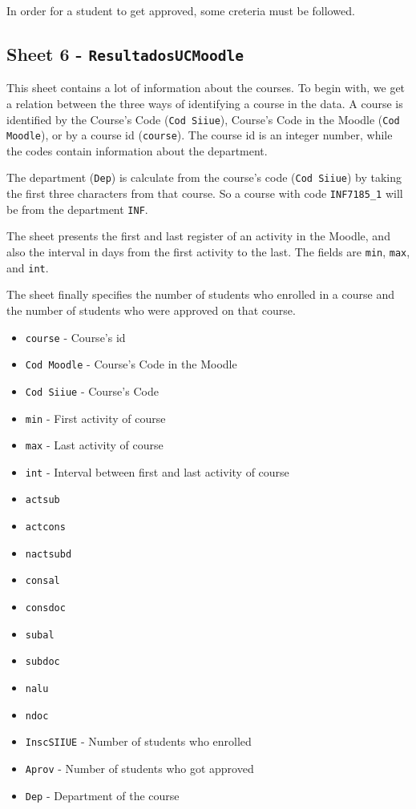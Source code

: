 In order for a student to get approved, some creteria must be followed.

\subsection{Sheet 6 - \texttt{ResultadosUCMoodle}}

This sheet contains a lot of information about the courses. To begin with, we
get a relation between the three ways of identifying a course in the data. A
course is identified by the Course's Code (\texttt{Cod Siiue}), Course's Code
in the Moodle (\texttt{Cod Moodle}), or by a course id (\texttt{course}). The
course id is an integer number, while the codes contain information about the
department.

The department (\texttt{Dep}) is calculate from the course's code (\texttt{Cod
Siiue}) by taking the first three characters from that course. So a course with
code \texttt{INF7185\_1} will be from the department \texttt{INF}.

The sheet presents the first and last register of an activity in the Moodle,
and also the interval in days from the first activity to the last. The fields
are \texttt{min}, \texttt{max}, and \texttt{int}.


The sheet finally specifies the number of students who enrolled in a course and
the number of students who were approved on that course.

\begin{itemize}
    \item \texttt{course} - Course's id
    \item \texttt{Cod Moodle} - Course's Code in the Moodle
    \item \texttt{Cod Siiue} - Course's Code
    \item \texttt{min} - First activity of course
    \item \texttt{max} - Last activity of course
    \item \texttt{int} - Interval between first and last activity of course
    \item \texttt{actsub}
    \item \texttt{actcons}
    \item \texttt{nactsubd}
    \item \texttt{consal}
    \item \texttt{consdoc}
    \item \texttt{subal}
    \item \texttt{subdoc}
    \item \texttt{nalu}
    \item \texttt{ndoc}
    \item \texttt{InscSIIUE} - Number of students who enrolled
    \item \texttt{Aprov} - Number of students who got approved
    \item \texttt{Dep} - Department of the course
\end{itemize}

